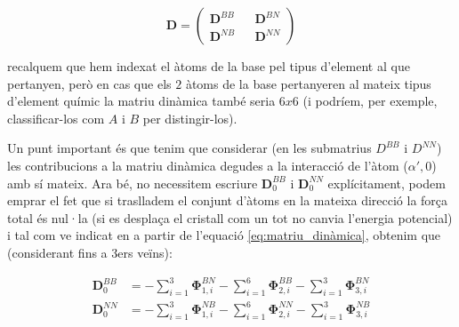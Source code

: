 \documentclass[12pt]{article} %
\let\vec\mathbf %
\begin{document}
\begin{equation}
 \label{eq:formamatriudinamica}
 \mathbf D=
 \begin{pmatrix}
  \mathbf D^{BB} && \mathbf D^{BN}\\
  \mathbf D^{NB} && \mathbf D^{NN}
 \end{pmatrix}
\end{equation}

recalquem que hem indexat el àtoms de la base pel tipus d'element al que pertanyen, però en cas que els $2$ àtoms de la base pertanyeren al mateix tipus d'element químic la matriu dinàmica també seria $6x6$ (i podríem, per exemple, classificar-los com $A$ i $B$ per distingir-los).

Un punt important és que tenim que considerar (en les submatrius $D^{BB}$ i $D^{NN}$) les contribucions a la matriu dinàmica degudes a la interacció de l'àtom ($\alpha',0$) amb sí mateix. Ara bé, no necessitem escriure $\vec D_0^{BB}$ i $\vec D_0^{NN}$ explícitament, podem emprar el fet que si traslladem el conjunt d'àtoms en la mateixa direcció la força total és nul·la (si es desplaça el cristall com un tot no canvia l'energia potencial) i tal com ve indicat en \cite{falkovsky08_symmet_const_phonon_disper_graph} a partir de l'equació \ref{eq:matriu_dinàmica}, obtenim que (considerant fins a 3ers veïns):


\begin{equation}\begin{split}
\vec D_0^{BB}&=-\sum_{i=1}^3\vec \Phi_{1,i}^{BN}-\sum_{i=1}^6\vec \Phi_{2,i}^{BB}-\sum_{i=1}^3\vec \Phi_{3,i}^{BN} \\
\vec D_0^{NN}&=-\sum_{i=1}^3\vec \Phi_{1,i}^{NB}-\sum_{i=1}^6\vec \Phi_{2,i}^{NN}-\sum_{i=1}^3\vec \Phi_{3,i}^{NB}
\end{split}
\end{equation}
\end{document}
